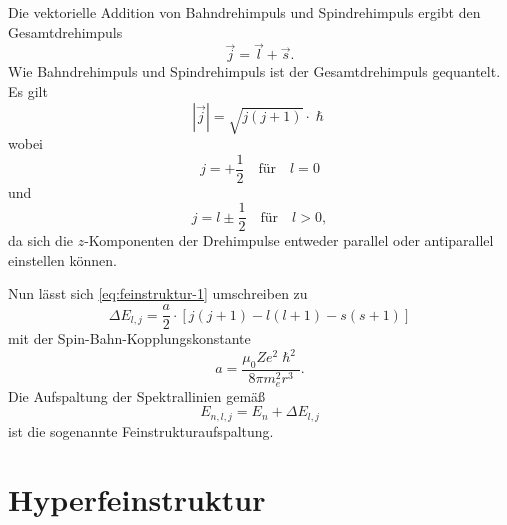 \documentclass[../bericht.tex]{subfiles}
\begin{document}
      Die vektorielle Addition von Bahndrehimpuls und Spindrehimpuls ergibt den Gesamtdrehimpuls
      \begin{equation*}
        \vec{j}=\vec{l}+\vec{s}.
      \end{equation*}
      Wie Bahndrehimpuls und Spindrehimpuls ist der Gesamtdrehimpuls gequantelt. Es gilt
      \begin{equation*}
        |\vec{j}|=\sqrt{j(j+1)}\cdot \hslash
      \end{equation*}
      wobei
      \begin{equation*}
        j=+\frac{1}{2} \quad \text{für} \quad l=0
      \end{equation*}
      und
      \begin{equation*}
        j=l\pm \frac{1}{2} \quad \text{für} \quad l>0,
      \end{equation*}
      da sich die $z$-Komponenten der Drehimpulse entweder parallel oder antiparallel einstellen können.

      Nun lässt sich \eqref{eq:feinstruktur-1} umschreiben zu
      \begin{equation}
        \Delta E_{l,j}=\frac{a}{2}\cdot \left[j(j+1)-l(l+1)-s(s+1)\right]
      \end{equation}
      mit der Spin-Bahn-Kopplungskonstante
      \begin{equation*}
        a=\frac{\mu_0 Z e^2\hslash ^2}{8\pi m_e^2r^3}.
      \end{equation*}
      Die Aufspaltung der Spektrallinien gemäß
      \begin{equation}
        E_{n,l,j}=E_n + \Delta E_{l,j}
      \end{equation}
      ist die sogenannte Feinstrukturaufspaltung.


    \section{Hyperfeinstruktur}
    \label{sec:hyperfeinstruktur}
\end{document}
